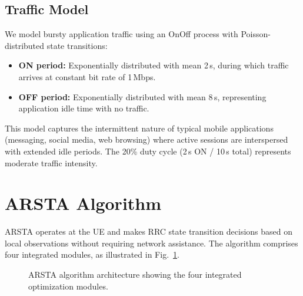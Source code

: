 \documentclass[conference]{IEEEtran}
\begin{document}
\subsection{Traffic Model}
\label{subsec:traffic}

We model bursty application traffic using an OnOff process with Poisson-distributed state transitions:

\begin{itemize}
    \item \textbf{ON period:} Exponentially distributed with mean 2\,s, during which traffic arrives at constant bit rate of 1\,Mbps.
    \item \textbf{OFF period:} Exponentially distributed with mean 8\,s, representing application idle time with no traffic.
\end{itemize}

This model captures the intermittent nature of typical mobile applications (messaging, social media, web browsing) where active sessions are interspersed with extended idle periods. The 20\% duty cycle (2\,s ON / 10\,s total) represents moderate traffic intensity.

\section{ARSTA Algorithm}
\label{sec:arsta}

ARSTA operates at the UE and makes RRC state transition decisions based on local observations without requiring network assistance. The algorithm comprises four integrated modules, as illustrated in Fig.~\ref{fig:arsta_overview}.

\begin{figure}[t]
    \centering
    \caption{ARSTA algorithm architecture showing the four integrated optimization modules.}
    \label{fig:arsta_overview}
\end{figure}
\end{document}
